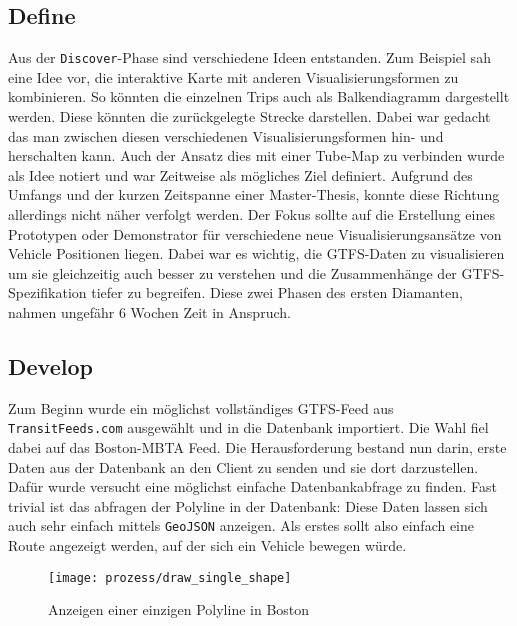 \begin{newpage}
    \subsection{Define}
    \label{sub:define}
      Aus der \texttt{Discover}-Phase sind verschiedene Ideen entstanden. Zum Beispiel sah eine Idee vor, die interaktive Karte mit anderen Visualisierungsformen zu kombinieren. So könnten die einzelnen Trips auch als Balkendiagramm dargestellt werden. Diese könnten die zurückgelegte Strecke darstellen. Dabei war gedacht das man zwischen diesen verschiedenen Visualisierungsformen hin- und herschalten kann. Auch der Ansatz dies mit einer Tube-Map zu verbinden wurde als Idee notiert und war Zeitweise als mögliches Ziel definiert. Aufgrund des Umfangs und der kurzen Zeitspanne einer Master-Thesis, konnte diese Richtung allerdings nicht näher verfolgt werden. Der Fokus sollte auf die Erstellung eines Prototypen oder Demonstrator für verschiedene neue Visualisierungsansätze von Vehicle Positionen liegen. Dabei war es wichtig, die GTFS-Daten zu visualisieren um sie gleichzeitig auch besser zu verstehen und die Zusammenhänge der GTFS-Spezifikation tiefer zu begreifen. Diese zwei Phasen des ersten Diamanten, nahmen ungefähr 6 Wochen Zeit in Anspruch.

      

    \subsection{Develop}
    \label{sub:develop}
      Zum Beginn wurde ein möglichst vollständiges GTFS-Feed aus \texttt{TransitFeeds.com} ausgewählt und in die Datenbank importiert. Die Wahl fiel dabei auf das Boston-MBTA Feed. Die Herausforderung bestand nun darin, erste Daten aus der Datenbank an den Client zu senden und sie dort darzustellen. Dafür wurde versucht eine möglichst einfache Datenbankabfrage zu finden. Fast trivial ist das abfragen der Polyline in der Datenbank: \colorbox{materialGrey}{\texttt{}}
      Diese Daten lassen sich auch sehr einfach mittels \texttt{GeoJSON} anzeigen. Als erstes sollt also einfach eine Route angezeigt werden, auf der sich ein Vehicle bewegen würde.

      \begin{figure}[htbp]
        \begin{center}
          \texttt{[image: prozess/draw\_single\_shape]}
          \caption{Anzeigen einer einzigen Polyline in Boston}
          \label{fig:prozess/draw_single_shape}
        \end{center}
      \end{figure}
      

\end{newpage}

